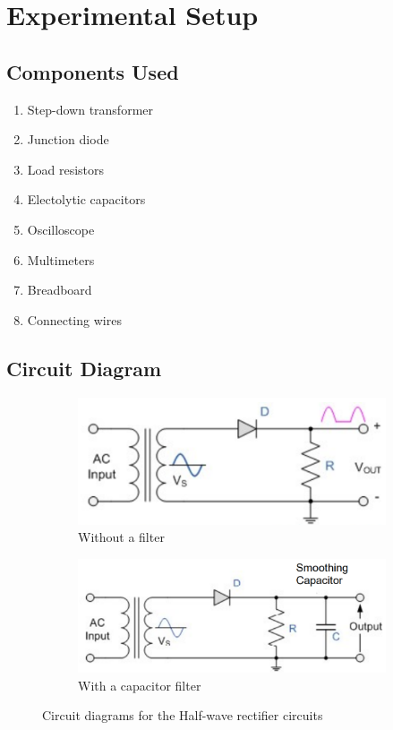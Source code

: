 \section{Experimental Setup}

\subsection{Components Used}
\begin{enumerate}
    \item Step-down transformer
    \item Junction diode
    \item Load resistors
    \item Electolytic capacitors
    \item Oscilloscope
    \item Multimeters
    \item Breadboard
    \item Connecting wires
\end{enumerate}

\subsection{Circuit Diagram}

\begin{figure}[H]
     \centering
     \begin{subfigure}[b]{1\columnwidth}
         \centering
         \includegraphics[width=\textwidth]{images/f3.png}
         \caption{Without a filter}
     \end{subfigure}
     \hfill
     \begin{subfigure}[b]{1\columnwidth}
         \centering
         \includegraphics[width=\textwidth]{images/f4.png}
         \caption{With a capacitor filter}
     \end{subfigure}
     \hfill
        \caption{Circuit  diagrams for the Half-wave rectifier circuits}
\end{figure}